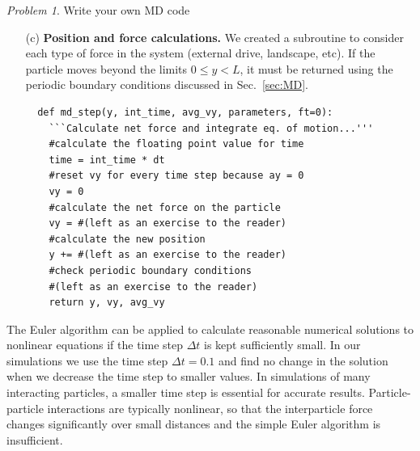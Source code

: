 \documentclass[preprint,showpacs,preprintnumbers,amsmath,amssymb,aps,prb]{revtex4-1}
\theoremstyle{remark}
\newtheorem{problem}{Problem}
\begin{document}
\begin{problem}{Write your own MD code}
\begin{enumerate}
\item[(c)] {\bf Position and force calculations.}
  We created a subroutine to consider each
  type of force in the system (external drive, landscape, etc).
  If the particle moves beyond the limits
  $0 \le y < L$,
  it must be returned 
  using the   periodic boundary conditions discussed
  in Sec.~\ref{sec:MD}.
\begin{verbatim}
  def md_step(y, int_time, avg_vy, parameters, ft=0):
    ```Calculate net force and integrate eq. of motion...'''
    #calculate the floating point value for time
    time = int_time * dt
    #reset vy for every time step because ay = 0 
    vy = 0 
    #calculate the net force on the particle
    vy = #(left as an exercise to the reader)
    #calculate the new position
    y += #(left as an exercise to the reader)
    #check periodic boundary conditions
    #(left as an exercise to the reader)
    return y, vy, avg_vy
\end{verbatim}

  \end{enumerate}

  The Euler algorithm can be applied to
  calculate reasonable numerical solutions to 
  nonlinear
  equations if the time step $\Delta t$
  is kept sufficiently small.\cite{Newman}
  In our simulations we use the time step $\Delta t = 0.1$
  and find no change in the solution
  when we decrease the time step to smaller values.
  In simulations of
  many interacting particles,
  a smaller
  time step is essential for accurate results.
  Particle-particle interactions are typically nonlinear,
  so that the interparticle force changes significantly over small distances and the simple Euler algorithm is insufficient.
  
\end{problem}
\end{document}
